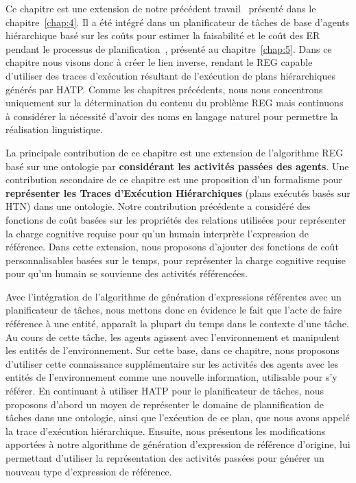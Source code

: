 Ce chapitre est une extension de notre précédent travail~\cite{buisan_2020_efficient} présenté dans le chapitre~\ref{chap:4}. Il a été intégré dans un planificateur de tâches de base d'agents hiérarchique basé sur les coûts pour estimer la faisabilité et le coût des ER pendant le processus de planification~\cite{buisan_2020_human}, présenté au chapitre~\ref{chap:5}. Dans ce chapitre nous visons donc à créer le lien inverse, rendant le REG capable d'utiliser des traces d'exécution résultant de l'exécution de plans hiérarchiques générés par HATP. Comme les chapitres précédents, nous nous concentrons uniquement sur la détermination du contenu du problème REG mais continuons à considérer la nécessité d'avoir des noms en langage naturel pour permettre la réalisation linguistique.

La principale contribution de ce chapitre est une extension de l'algorithme REG basé sur une ontologie par \textbf{considérant les activités passées des agents}. Une contribution secondaire de ce chapitre est une proposition d'un formalisme pour \textbf{représenter les Traces d'Exécution Hiérarchiques} (plans exécutés basés sur HTN) dans une ontologie. Notre contribution précédente a considéré des fonctions de coût basées sur les propriétés des relations utilisées pour représenter la charge cognitive requise pour qu'un humain interprète l'expression de référence. Dans cette extension, nous proposons d'ajouter des fonctions de coût personnalisables basées sur le temps, pour représenter la charge cognitive requise pour qu'un humain se souvienne des activités référencées. 

Avec l'intégration de l'algorithme de génération d'expressions référentes avec un planificateur de tâches, nous mettons donc en évidence le fait que l'acte de faire référence à une entité, apparaît la plupart du temps dans le contexte d'une tâche. Au cours de cette tâche, les agents agissent avec l'environnement et manipulent les entités de l'environnement. Sur cette base, dans ce chapitre, nous proposons d'utiliser cette connaissance supplémentaire sur les activités des agents avec les entités de l'environnement comme une nouvelle information, utilisable pour s'y référer. En continuant à utiliser HATP pour le planificateur de tâches, nous proposons d'abord un moyen de représenter le domaine de plannification de tâches dans une ontologie, ainsi que l'exécution de ce plan, que nous avons appelé la trace d'exécution hiérarchique. Ensuite, nous présentons les modifications apportées à notre algorithme de génération d'expression de référence d'origine, lui permettant d'utiliser la représentation des activités passées pour générer un nouveau type d'expression de référence. 

